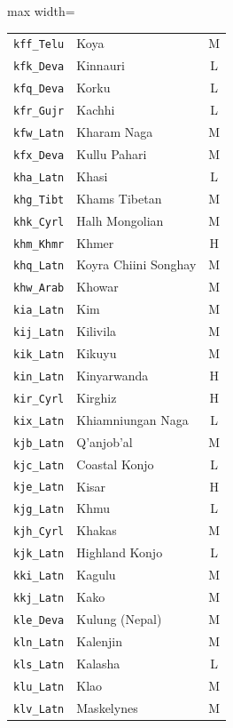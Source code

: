 {\begin{adjustbox}{max width=\textwidth}
\begin{tabular}{llc}
        \texttt{kff\_Telu} & Koya & M \\
        \texttt{kfk\_Deva} & Kinnauri & L \\
        \texttt{kfq\_Deva} & Korku & L \\
        \texttt{kfr\_Gujr} & Kachhi & L \\
        \texttt{kfw\_Latn} & Kharam Naga & M \\
        \texttt{kfx\_Deva} & Kullu Pahari & M \\
        \texttt{kha\_Latn} & Khasi & L \\
        \texttt{khg\_Tibt} & Khams Tibetan & M \\
        \texttt{khk\_Cyrl} & Halh Mongolian & M \\
        \texttt{khm\_Khmr} & Khmer & H \\
        \texttt{khq\_Latn} & Koyra Chiini Songhay & M \\
        \texttt{khw\_Arab} & Khowar & M \\
        \texttt{kia\_Latn} & Kim & M \\
        \texttt{kij\_Latn} & Kilivila & M \\
        \texttt{kik\_Latn} & Kikuyu & M \\
        \texttt{kin\_Latn} & Kinyarwanda & H \\
        \texttt{kir\_Cyrl} & Kirghiz & H \\
        \texttt{kix\_Latn} & Khiamniungan Naga & L \\
        \texttt{kjb\_Latn} & Q'anjob'al & M \\
        \texttt{kjc\_Latn} & Coastal Konjo & L \\
        \texttt{kje\_Latn} & Kisar & H \\
        \texttt{kjg\_Latn} & Khmu & L \\
        \texttt{kjh\_Cyrl} & Khakas & M \\
        \texttt{kjk\_Latn} & Highland Konjo & L \\
        \texttt{kki\_Latn} & Kagulu & M \\
        \texttt{kkj\_Latn} & Kako & M \\
        \texttt{kle\_Deva} & Kulung (Nepal) & M \\
        \texttt{kln\_Latn} & Kalenjin & M \\
        \texttt{kls\_Latn} & Kalasha & L \\
        \texttt{klu\_Latn} & Klao & M \\
        \texttt{klv\_Latn} & Maskelynes & M \\

\end{tabular}
\end{adjustbox}}
